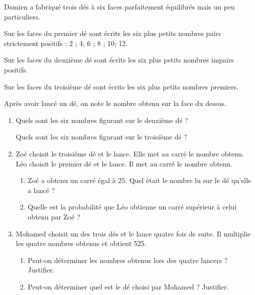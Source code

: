 \documentclass[a4paper,10pt]{report}
\begin{document}
\begin{ex}
\medskip

Damien a fabriqué trois dés à six faces parfaitement équilibrés mais un peu particuliers.

Sur les faces du premier dé sont écrits les six plus petits nombres pairs strictement positifs : 2 ; 4; 6 ; 8 ; 10; 12.

Sur les faces du deuxième dé sont écrits les six plus petits nombres impairs positifs.

Sur les faces du troisième dé sont écrits les six plus petits nombres premiers.

Après avoir lancé un dé, on note le nombre obtenu sur la face du dessus.

\medskip

\begin{enumerate}
\item Quels sont les six nombres figurant sur le deuxième dé ? 

Quels sont les six nombres figurant sur le troisième dé ?
\item  Zoé choisit le troisième dé et le lance. Elle met au carré le nombre obtenu.
Léo choisit le premier dé et le lance. Il met au carré le nombre obtenu.
\begin{enumerate}
\item Zoé a obtenu un carré égal à $25$. Quel était le nombre lu sur le dé qu'elle a lancé ?
\item Quelle est la probabilité que Léo obtienne un carré supérieur à celui obtenu par Zoé ?
\end{enumerate}
\item  Mohamed choisit un des trois dés et le lance quatre fois de suite. Il multiplie les quatre nombres obtenus et obtient 525.
\begin{enumerate}
\item Peut-on déterminer les nombres obtenus lors des quatre lancers ? Justifier.
\item Peut-on déterminer quel est le dé choisi par Mohamed ? Justifier.
\end{enumerate}
\end{enumerate}
\end{ex}
\end{document}
